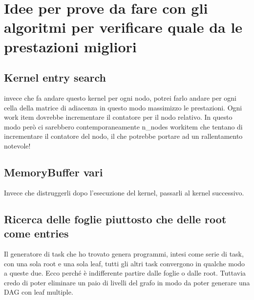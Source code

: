 \documentclass{article}
\begin{document}
    \section{Idee per prove da fare con gli algoritmi per verificare quale da le prestazioni migliori}
        \subsection{Kernel entry search}
            invece che fa andare questo kernel per ogni nodo, potrei farlo andare per ogni cella della matrice di adiacenza in questo modo massimizzo le prestazioni. 
            Ogni work item dovrebbe incrementare il contatore per il nodo relativo. 
            In questo modo però ci sarebbero contemporaneamente n\_nodes workitem che tentano di incrementare il contatore del nodo, il che potrebbe portare ad un rallentamento notevole!
        \subsection{MemoryBuffer vari}
            Invece che distruggerli dopo l'esecuzione del kernel, passarli al kernel successivo.
        \subsection{Ricerca delle foglie piuttosto che delle root come entries}
            Il generatore di task che ho trovato genera programmi, intesi come serie di task, con una sola root e una sola leaf, tutti gli altri task convergono in qualche modo a queste due.
            Ecco perché è indifferente partire dalle foglie o dalle root.
            Tuttavia credo di poter eliminare un paio di livelli del grafo in modo da poter generare una DAG con leaf multiple.
\end{document}
